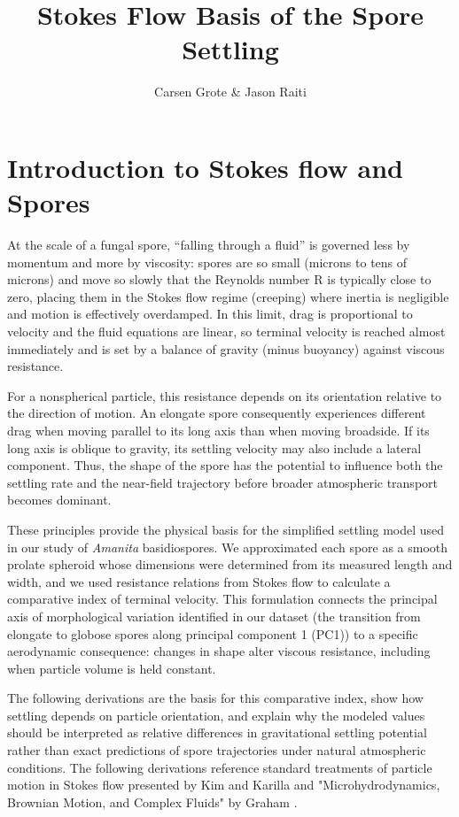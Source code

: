 \documentclass{article}
\title{Stokes Flow Basis of the Spore Settling}
\author{Carsen Grote \& Jason Raiti}
\begin{document}
\maketitle
\section{Introduction to Stokes flow and Spores}
At the scale of a fungal spore, “falling through a fluid” is governed less by momentum and more by viscosity: spores are so small (microns to tens of microns) and move so slowly that the Reynolds number 
R is typically close to zero, placing them in the Stokes flow regime (creeping) where inertia is negligible and motion is effectively overdamped. In this limit, drag is proportional to velocity and the fluid equations are linear, so terminal velocity is reached almost immediately and is set by a balance of gravity (minus buoyancy) against viscous resistance. 

For a nonspherical particle, this
resistance depends on its orientation relative to the direction of motion.
An elongate spore consequently experiences different drag when moving
parallel to its long axis than when moving broadside. If its long axis is
oblique to gravity, its settling velocity may also include a lateral
component. Thus, the shape of the spore has the potential to influence both the settling
rate and the near-field trajectory before broader atmospheric transport becomes
dominant.

These principles provide the physical basis for the simplified settling model
used in our study of \textit{Amanita} basidiospores. We approximated each
spore as a smooth prolate spheroid whose dimensions were determined from its
measured length and width, and we used resistance relations from Stokes flow
to calculate a comparative index of terminal velocity. This formulation
connects the principal axis of morphological variation identified in our
dataset (the transition from elongate to globose spores along principal
component 1 (PC1)) to a specific aerodynamic consequence: changes in shape
alter viscous resistance, including when particle volume is held constant.

The following derivations are the basis for this comparative index, show how settling depends on particle orientation, and explain why the
modeled values should be interpreted as relative differences in gravitational
settling potential rather than exact predictions of spore trajectories under
natural atmospheric conditions. The following derivations reference standard treatments of particle motion in
Stokes flow presented by Kim and Karilla \cite{k&k} and "Microhydrodynamics, Brownian Motion, and Complex Fluids" by Graham \cite{Graham}. 
\end{document}
